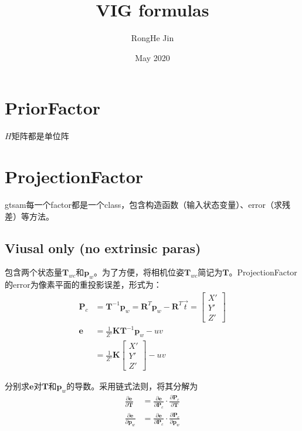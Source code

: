 \documentclass{article}
\title{VIG formulas}
\author{RongHe Jin}
\date{May 2020}
\begin{document}
\maketitle

\section{PriorFactor}
$H$矩阵都是单位阵

\section{ProjectionFactor}
gtsam每一个factor都是一个class，包含构造函数（输入状态变量）、error（求残差）等方法。

\subsection{Viusal only (no extrinsic paras)}\label{section:VisualPrj}
包含两个状态量$\boldsymbol{T}_{wc}$和$\boldsymbol{p}_w$。为了方便，将相机位姿$\boldsymbol{T}_{wc}$简记为$\boldsymbol{T}$。ProjectionFactor的error为像素平面的重投影误差，形式为：
\begin{equation}
	\begin{aligned}
		\boldsymbol{P}_c & =\boldsymbol{T}^{-1} \boldsymbol{p}_w =\boldsymbol{R}^T\boldsymbol{p}_w-\boldsymbol{R}^T\vec{t}  = 
		\left[
		\begin{matrix}
		X'\\
		Y'\\                                         
		Z' 
		\end{matrix}
		\right] \\
		\boldsymbol {e}  & =\frac{1}{Z'}\boldsymbol{K} \boldsymbol{T}^{-1} \boldsymbol{p}_w  -uv                              \\&=
		\frac{1}{Z'}\boldsymbol{K} 
		\left[
		\begin{matrix}
		X'\\
		Y'\\                                          
		Z' 
		\end{matrix}
		\right]-uv
	\end{aligned}
\end{equation}

分别求$\boldsymbol{e} $对$\boldsymbol{T} $和$\boldsymbol{p}_w $的导数。采用链式法则，将其分解为
\begin{equation}
	\begin{aligned}
		\frac{\partial{\boldsymbol{e}}}{\partial{\boldsymbol{T}}}   & = \frac{\partial{\boldsymbol{e}}}{\partial{\boldsymbol{P}_c}}\cdot \frac{\partial{\boldsymbol{P}_c}}{\partial{\boldsymbol{T}}}   
		\\
		\frac{\partial{\boldsymbol{e}}}{\partial{\boldsymbol{p}_w}} & = \frac{\partial{\boldsymbol{e}}}{\partial{\boldsymbol{P}_c}}\cdot \frac{\partial{\boldsymbol{P}_c}}{\partial{\boldsymbol{p}_w}} 
	\end{aligned}
\end{equation}
\end{document}
